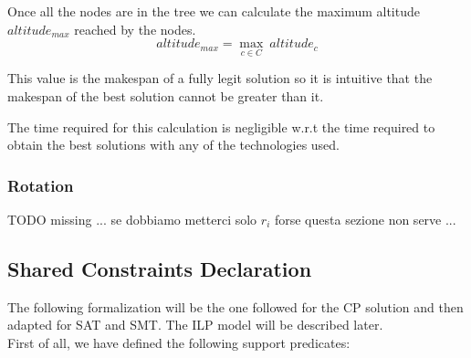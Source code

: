         Once all the nodes are in the tree we can calculate the maximum altitude $altitude_{max}$ reached by the nodes.
        \begin{equation}
            altitude_{max} = \max_{c \in C}\  altitude_c
        \end{equation}

        This value is the makespan of a fully legit solution so it is intuitive that the makespan of the best solution cannot
        be greater than it. 
        
        The time required for this calculation is negligible w.r.t the time required to obtain the best solutions with any 
        of the technologies used.

    \subsubsection{Rotation}
        \colorbox{BurntOrange}{TODO missing ... se dobbiamo metterci solo $r_i$ forse questa sezione non serve ...}



\subsection{Shared Constraints Declaration} \label{sec:shared_constraints}
    The following formalization will be the one followed for the CP solution and then adapted for
    SAT and SMT. The ILP model will be described later. \\

    First of all, we have defined the following support predicates:


